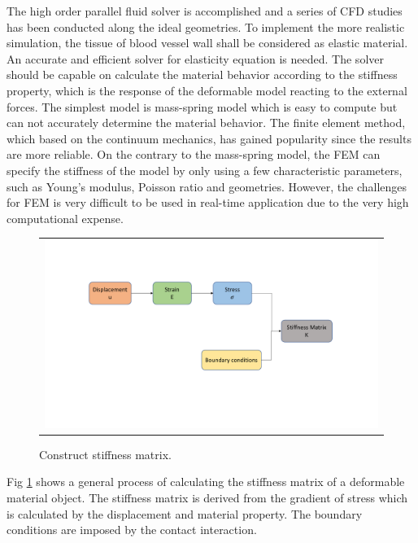 The high order parallel fluid solver \cite{liang2007large, liang2007large, liang2009effect} is accomplished and a series of CFD studies has been conducted along the ideal geometries. To implement the more realistic simulation, the tissue of blood vessel wall shall be considered as elastic material. An accurate and efficient solver for elasticity equation is needed. The solver should be capable on calculate the material behavior according to the stiffness property, which is the response of the deformable model reacting to the external forces. The simplest model is mass-spring model which is easy to compute but can not accurately determine the material behavior. The finite element method, which based on the continuum mechanics, has gained popularity since the results are more reliable. On the contrary to the mass-spring model, the FEM can specify the stiffness of the model by only using a few characteristic parameters, such as Young's modulus, Poisson ratio and geometries. However, the challenges for FEM is very difficult to be used in real-time application due to the very high computational expense. 

\begin{figure}[H]
	\centering
	\begin{tabular}{c}
		\includegraphics[width=1.0\textwidth]{./pics/construct_matrix}
	\end{tabular}
	\caption{\footnotesize Construct stiffness matrix.} \label{fig: ch1f2}
\end{figure}

Fig \ref{fig: ch1f2} shows a general process of calculating the stiffness matrix of a deformable material object. The stiffness matrix is derived from the gradient of stress which is calculated by the displacement and material property. The boundary conditions are imposed by the contact interaction.

